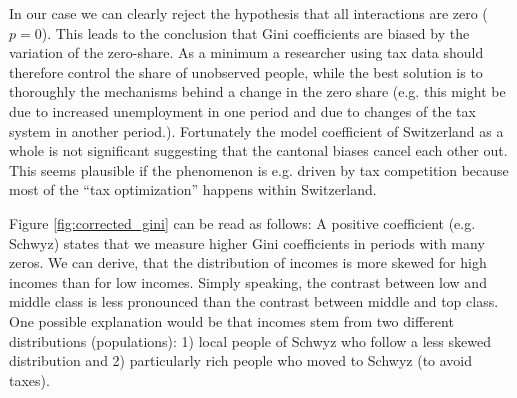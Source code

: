 \documentclass[twoside]{article}\usepackage[]{graphicx}\usepackage[]{color}
\begin{document}
\begin{multicols}{2}
In our case we can clearly reject the hypothesis that all interactions are zero ($p=0$). This leads to the conclusion that Gini coefficients are biased by the variation of the zero-share. As a minimum a researcher using tax data should therefore control the share of unobserved people, while the best solution is to thoroughly the mechanisms behind a change in the zero share (e.g. this might be due to increased unemployment in one period and due to changes of the tax system in another period.). Fortunately the model coefficient of Switzerland as a whole is not significant suggesting that the cantonal biases cancel each other out. This seems plausible if the phenomenon is e.g. driven by tax competition because most of the ``tax optimization'' happens within Switzerland.





Figure \ref{fig:corrected_gini} can be read as follows: A positive coefficient (e.g. Schwyz) states that we measure higher Gini coefficients in periods with many zeros. We can derive, that the distribution of incomes is more skewed for high incomes than for low incomes. Simply speaking, the contrast between low and middle class is less pronounced than the contrast between middle and top class. One possible explanation would be that incomes stem from two different distributions (populations): 1) local people of Schwyz who follow a less skewed distribution and 2) particularly rich people who moved to Schwyz (to avoid taxes). 


\end{multicols}
\end{document}
